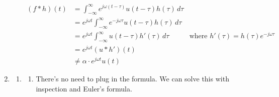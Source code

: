 \documentclass[12pt]{article}
\begin{document}
\begin{enumerate}
\begin{enumerate}
\begin{align*}
                              (f * h)(t)
                               & = \int_{-\infty}^{\infty} e^{j\omega(t-\tau)} u(t-\tau) h(\tau)\,d\tau             \\
                               & = e^{j \omega t} \int_{-\infty}^{\infty} e^{-j\omega\tau} u(t-\tau) h(\tau)\,d\tau \\
                               & = e^{j \omega t} \int_{-\infty}^{\infty} u(t-\tau) h'(\tau)\,d\tau
                               & \text{where }h'(\tau)=h(\tau)e^{-j\omega\tau}                                      \\
                               & = e^{j\omega t} (u * h')(t)                                                        \\
                               & \ne \alpha \cdot e^{j\omega t} u(t)
                        \end{align*}
            \end{enumerate}
      \item \begin{enumerate}
                  \item \begin{enumerate}
                              \item There's no need to plug in the formula.
                                    We can solve this with inspection and Euler's formula.


\end{enumerate}
\end{enumerate}
\end{enumerate}
\end{document}
